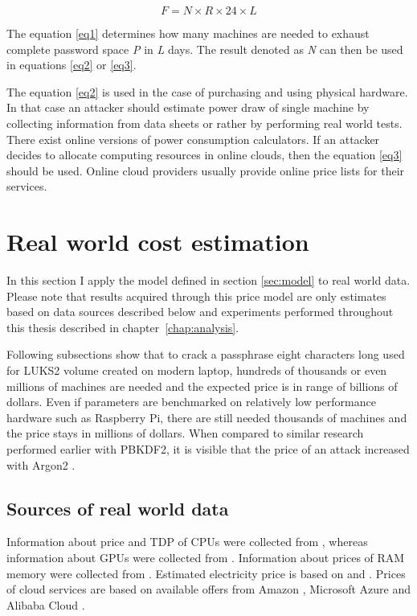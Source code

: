 \documentclass[nolof,digital]{fithesis3}
\begin{document}
\begin{equation}
\label{eq3}
F = N \times R \times 24 \times L
\end{equation}

The equation \ref{eq1} determines how many machines are needed to exhaust complete password space \emph{P} in \emph{L} days. The result denoted as \emph{N} can then be used in equations \ref{eq2} or \ref{eq3}.

The equation \ref{eq2} is used in the case of purchasing and using physical hardware. In that case an attacker should estimate power draw of single machine by collecting information from data sheets or rather by performing real world tests. There exist online versions of power consumption calculators. If an attacker decides to allocate computing resources in online clouds, then the equation \ref{eq3} should be used. Online cloud providers usually provide online price lists for their services.

\section{Real world cost estimation}
In this section I apply the model defined in section \ref{sec:model} to real world data. Please note that results acquired through this price model are only estimates based on data sources described below and experiments performed throughout this thesis described in chapter~\ref{chap:analysis}.

Following subsections show that to crack a passphrase eight characters long used for LUKS2 volume created on modern laptop, hundreds of thousands or even millions of machines are needed and the expected price is in range of billions of dollars. Even if parameters are benchmarked on relatively low performance hardware such as Raspberry Pi, there are still needed thousands of machines and the price stays in millions of dollars. When compared to similar research performed earlier with PBKDF2, it is visible that the price of an attack increased with Argon2 \parencite{pbkdfresearch}.

\subsection{Sources of real world data}
Information about price and TDP of CPUs were collected from \parencite{intelspecs}, whereas information about GPUs were collected from \parencites{teslak20}{teslap100}{geforceprice}{geforce}. Information about prices of RAM memory were collected from \parencite{memoryprice}. Estimated electricity price is based on \parencite{electricity} and \parencite{euroelectricity}. Prices of cloud services are based on available offers from Amazon \parencites{amazon}{amazoncalc}, Microsoft Azure \parencite{azure} and Alibaba Cloud \parencite{alibaba}.
\end{document}
